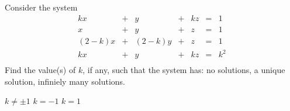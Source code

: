 
\begin{Exercise}[name={},
title={}, 
origin={\cite{BS}},
counter=Exercise]
Consider the system
\[
\begin{array}{rrrrrrrr}
kx & + & y &+ &kz & =& 1\\
x   & + & y & + & z & =&  1\\
(2-k)x  & + & (2-k)y&+ &z & =&  1\\
kx  & + & y&+ &kz & =&  k^2\\
\end{array}
\]
Find the value(s) of $k$, if any, such that the system has:
\Question no solutions,
\Question a unique solution, 
\Question infiniely many solutions.
\end{Exercise}

\begin{Answer}
\begin{multicols}{3}
\Question $k\neq\pm 1$
\Question $k=-1$
\Question $k=1$
\EndCurrentQuestion
\end{multicols}
\end{Answer}

